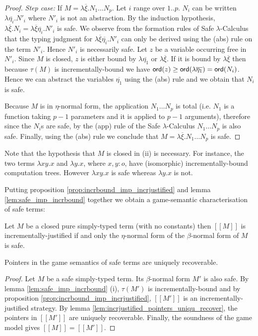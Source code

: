 \documentclass{llncs}
\newcommand\ord[1]{{\sf ord}(#1)}
\newcommand{\lsem}{[\![} %
\newcommand{\rsem}{]\!]} %
\newcommand{\sem}[1]{{\lsem #1 \rsem}}
\begin{document}
\begin{proof}
\emph{Step case:} If $M = \lambda \overline{\xi} . N_1 \ldots N_p$.
Let $i$ range over $1..p$. $N_i$ can be written $\lambda
\overline{\eta_i} . N'_i$ where $N'_i$ is not an abstraction. By the
induction hypothesis, $\lambda \overline{\xi} . N_i = \lambda
\overline{\xi} \overline{\eta_i} . N'_i$ is safe. We observe from
the formation rules of Safe $\lambda$-Calculus that the typing
judgment for $\lambda \overline{\xi} \overline{\eta_i} . N'_i$ can
only be derived using the (abs) rule on the term $N'_i$. Hence
$N'_i$ is necessarily safe. Let $z$ be a variable occurring free in
$N'_i$. Since $M$ is closed, $z$ is either bound by $\lambda
\overline{\eta_1}$ or $\lambda \overline{\xi}$. If it is bound by
$\lambda \overline{\xi}$ then because $\tau(M)$ is
incrementally-bound we have $\ord{z} \geq \ord{\lambda
\overline{\eta_1}} = \ord{N_i}$. Hence we can abstract the variables
$\overline{\eta_1}$ using the (abs) rule and we obtain that $N_i$ is
safe.

Because $M$ is in $\eta$-normal form, the application $N_1 \ldots
N_p$ is total (i.e. $N_1$ is a function taking $p-1$ parameters and
it is applied to $p-1$ arguments), therefore since the $N_i$s are
safe, by the (app) rule of the Safe $\lambda$-Calculus $N_1 \ldots
N_p$ is also safe. Finally, using the (abs) rule we conclude that $M
= \lambda \overline{\xi} . N_1 \ldots N_p$ is safe.
\end{proof}

Note that the hypothesis that $M$ is closed in (ii) is necessary.
For instance, the two terms $\lambda x y .x$ and $\lambda y . x$,
where $x,y:o$, have (isomorphic) incrementally-bound computation
trees. However $\lambda x y .x$ is safe whereas $\lambda y . x$ is
not.



Putting proposition \ref{prop:incrbound_imp_incrjustified} and lemma
\ref{lem:safe_imp_incrbound} together we obtain a game-semantic
characterisation of safe terms:
\begin{corollary}
Let $M$ be a closed pure simply-typed term (with no constants) then
$\sem{M}$  is incrementally-justified  if and only the $\eta$-normal form of the
$\beta$-normal form of $M$ is safe.
\end{corollary}



\begin{theorem}
\label{thm:safe_ptr_recoverable} Pointers in the game semantics of
safe terms are uniquely recoverable.
\end{theorem}
\begin{proof}
Let $M$ be a safe simply-typed term. Its $\beta$-normal form $M'$
is also safe. By lemma \ref{lem:safe_imp_incrbound}
(i), $\tau(M')$ is incrementally-bound and by proposition
\ref{prop:incrbound_imp_incrjustified}, $\sem{M'}$ is an
incrementally-justified strategy. By lemma
\ref{lem:incrjustified_pointers_uniqu_recover}, the pointers in
$\sem{M'}$ are uniquely recoverable. Finally, the soundness of the
game model gives $\sem{M} = \sem{M'}$.
\end{proof}
\end{document}
